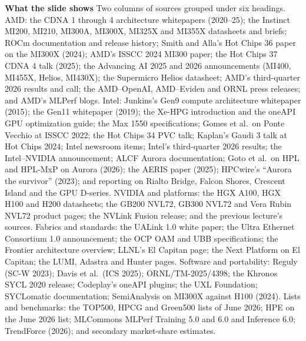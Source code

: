 \documentclass[11pt,letterpaper]{article}
\newcommand{\para}[1]{\medskip\noindent\textbf{#1}\quad}
\begin{document}
\para{What the slide shows} Two columns of sources grouped under six headings. AMD: the CDNA 1 through 4 architecture whitepapers (2020--25); the Instinct MI200, MI210, MI300A, MI300X, MI325X and MI355X datasheets and briefs; ROCm documentation and release history; Smith and Alla's Hot Chips 36 paper on the MI300X (2024); AMD's ISSCC 2024 MI300 paper; the Hot Chips 37 CDNA 4 talk (2025); the Advancing AI 2025 and 2026 announcements (MI400, MI455X, Helios, MI430X); the Supermicro Helios datasheet; AMD's third-quarter 2026 results and call; the AMD--OpenAI, AMD--Eviden and ORNL press releases; and AMD's MLPerf blogs. Intel: Junkins's Gen9 compute architecture whitepaper (2015); the Gen11 whitepaper (2019); the Xe-HPG introduction and the oneAPI GPU optimization guide; the Max 1550 specifications; Gomes et al.\ on Ponte Vecchio at ISSCC 2022; the Hot Chips 34 PVC talk; Kaplan's Gaudi 3 talk at Hot Chips 2024; Intel newsroom items; Intel's third-quarter 2026 results; the Intel--NVIDIA announcement; ALCF Aurora documentation; Goto et al.\ on HPL and HPL-MxP on Aurora (2026); the AERIS paper (2025); HPCwire's ``Aurora the survivor'' (2023); and reporting on Rialto Bridge, Falcon Shores, Crescent Island and the GPU D-series. NVIDIA and platforms: the HGX A100, HGX H100 and H200 datasheets; the GB200 NVL72, GB300 NVL72 and Vera Rubin NVL72 product pages; the NVLink Fusion release; and the previous lecture's sources. Fabrics and standards: the UALink 1.0 white paper; the Ultra Ethernet Consortium 1.0 announcement; the OCP OAM and UBB specifications; the Frontier architecture overview; LLNL's El Capitan page; the Next Platform on El Capitan; the LUMI, Adastra and Hunter pages. Software and portability: Reguly (SC-W 2023); Davis et al.\ (ICS 2025); ORNL/TM-2025/4398; the Khronos SYCL 2020 release; Codeplay's oneAPI plugins; the UXL Foundation; SYCLomatic documentation; SemiAnalysis on MI300X against H100 (2024). Lists and benchmarks: the TOP500, HPCG and Green500 lists of June 2026; HPE on the June 2026 list; MLCommons MLPerf Training 5.0 and 6.0 and Inference 6.0; TrendForce (2026); and secondary market-share estimates.
\end{document}
